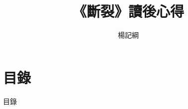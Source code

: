 \documentclass[dvipdfmx]{beamer} %
\author{楊記綱}
\title{《斷裂》讀後心得}
\begin{document}
\begin{frame}
  \titlepage
\end{frame}
\section{目錄}
\begin{frame}{目錄}
  \tableofcontents
\end{frame}
\end{document}
